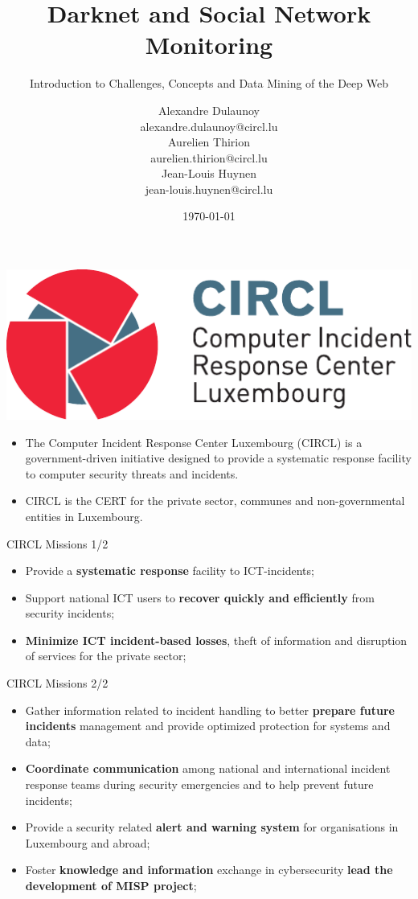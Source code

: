 \documentclass{beamer}
\author{\Large{Alexandre Dulaunoy}\\ \scriptsize{alexandre.dulaunoy@circl.lu}\\ \large{Aurelien Thirion}\\ \scriptsize{aurelien.thirion@circl.lu}\\ \large{Jean-Louis Huynen}\\ \scriptsize{jean-louis.huynen@circl.lu}\\}
\title{Darknet and Social Network Monitoring}
\subtitle{Introduction to Challenges, Concepts and Data Mining of the Deep Web}
\institute{info@circl.lu}
\date{\today}
\begin{document}
\begin{frame}[t,plain]
\titlepage
\end{frame}

\begin{frame}
 \includegraphics[scale=0.5]{logo-circl.pdf}
 \begin{itemize}
 \item The Computer Incident Response Center Luxembourg (CIRCL) is a government-driven initiative designed to provide a systematic response facility to computer security threats and incidents.
 \item CIRCL is the CERT for the private sector, communes and non-governmental entities in Luxembourg.
 \end{itemize}
\end{frame}

\begin{frame}{CIRCL Missions 1/2}
\begin{itemize}
\item Provide a {\bf systematic response} facility to ICT-incidents;
\item Support national ICT users to {\bf recover quickly and efficiently} from security incidents;
\item {\bf Minimize ICT incident-based losses}, theft of information and disruption of services for the private sector;
\end{itemize}
\end{frame}

\begin{frame}{CIRCL Missions 2/2}
\begin{itemize}
\item Gather information related to incident handling to better {\bf prepare future incidents} management and provide optimized protection for systems and data;
\item {\bf Coordinate communication} among national and international incident response teams during security emergencies and to help prevent future incidents;
\item Provide a security related {\bf alert and warning system} for organisations in Luxembourg and abroad;
\item Foster {\bf knowledge and information} exchange in cybersecurity {\bf lead the development of MISP project};
\end{itemize}
\end{frame}
\end{document}
